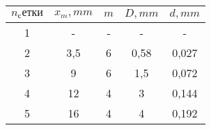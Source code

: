 \begin{tabular}{| c | c | c | c | c |}
\hline
$n_сетки$ & $x_m, mm$ & $m$ & $D, mm$ & $d, mm$\\
\hline
1 & - & - & - & -\\
\hline
2 & 3,5 & 6 & 0,58 & 0,027 \\
\hline
3 & 9 & 6 & 1,5 & 0,072\\
\hline
4 & 12 & 4 & 3 & 0,144\\
\hline
5 & 16 & 4 & 4 &  0,192\\
\hline
\end{tabular}

